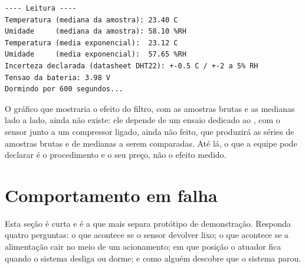 \begin{lstlisting}[style=terminal,
  caption={Saída serial de um ciclo com leitura válida},
  label={lst:serial}]
---- Leitura ----
Temperatura (mediana da amostra): 23.40 C
Umidade     (mediana da amostra): 58.10 %RH
Temperatura (media exponencial):  23.12 C
Umidade     (media exponencial):  57.65 %RH
Incerteza declarada (datasheet DHT22): +-0.5 C / +-2 a 5% RH
Tensao da bateria: 3.98 V
Dormindo por 600 segundos...
\end{lstlisting}

O gráfico que mostraria o efeito do filtro, com as amostras brutas e as
medianas lado a lado, ainda não existe: ele depende de um
ensaio dedicado ao , com o sensor junto a um compressor ligado,
ainda não feito, que produzirá as séries de amostras brutas e de medianas a serem
comparadas. Até lá, o que a equipe pode declarar é o procedimento e o
seu preço, não o efeito medido.

\section{Comportamento em falha}
\label{sec:falha}

\begin{orientacao}
Esta seção é curta e é a que mais separa protótipo de demonstração.
Responda quatro perguntas: o que acontece se o sensor devolver lixo; o
que acontece se a alimentação cair no meio de um acionamento; em que
posição o atuador fica quando o sistema desliga ou dorme; e como alguém
descobre que o sistema parou.
\end{orientacao}

